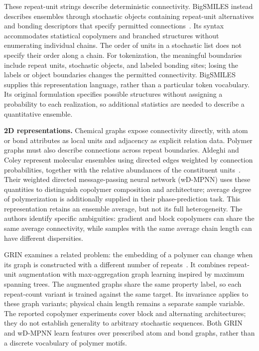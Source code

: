 These repeat-unit strings describe deterministic connectivity. BigSMILES instead describes ensembles through stochastic objects containing repeat-unit alternatives and bonding descriptors that specify permitted connections~\citep{lin2019bigsmiles}. Its syntax accommodates statistical copolymers and branched structures without enumerating individual chains. The order of units in a stochastic list does not specify their order along a chain. For tokenization, the meaningful boundaries include repeat units, stochastic objects, and labeled bonding sites; losing the labels or object boundaries changes the permitted connectivity. BigSMILES supplies this representation language, rather than a particular token vocabulary. Its original formulation specifies possible structures without assigning a probability to each realization, so additional statistics are needed to describe a quantitative ensemble.

\textbf{2D representations.}
Chemical graphs expose connectivity directly, with atom or bond attributes as local units and adjacency as explicit relation data. Polymer graphs must also describe connections across repeat boundaries. Aldeghi and Coley represent molecular ensembles using directed edges weighted by connection probabilities, together with the relative abundances of the constituent units~\citep{aldeghi2022ensemble}. Their weighted directed message-passing neural network (wD-MPNN) uses these quantities to distinguish copolymer composition and architecture; average degree of polymerization is additionally supplied in their phase-prediction task. This representation retains an ensemble average, but not its full heterogeneity. The authors identify specific ambiguities: gradient and block copolymers can share the same average connectivity, while samples with the same average chain length can have different dispersities.

GRIN examines a related problem: the embedding of a polymer can change when its graph is constructed with a different number of repeats~\citep{zhu2025grin}. It combines repeat-unit augmentation with max-aggregation graph learning inspired by maximum spanning trees. The augmented graphs share the same property label, so each repeat-count variant is trained against the same target. Its invariance applies to these graph variants; physical chain length remains a separate sample variable. The reported copolymer experiments cover block and alternating architectures; they do not establish generality to arbitrary stochastic sequences. Both GRIN and wD-MPNN learn features over prescribed atom and bond graphs, rather than a discrete vocabulary of polymer motifs.

